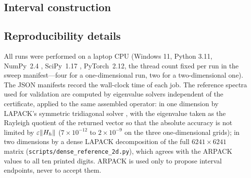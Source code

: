 \subsection{Interval construction}
\label{app:algorithm}

\begin{center}
\end{center}

\subsection{Reproducibility details}
\label{app:repro}

All runs were performed on a laptop CPU (Windows 11, Python 3.11,
NumPy~2.4 \citep{harris2020}, SciPy~1.17 \citep{virtanen2020}, PyTorch~2.12,
the thread count fixed per run in the sweep manifest---four for a
one-dimensional run, two for a two-dimensional one). The JSON manifests record
the wall-clock time of each job. The reference spectra used for validation are
computed by eigenvalue solvers independent of the certificate, applied to the
same assembled operator: in one dimension
by LAPACK's symmetric tridiagonal solver \citep{virtanen2020}, with the
eigenvalue taken as the Rayleigh quotient of the returned vector so that the
absolute accuracy is not limited by $\varepsilon\lVert H_h\rVert$ ($7\times10^{-12}$
to $2\times10^{-9}$ on the three one-dimensional grids); in
two dimensions by a dense LAPACK decomposition of the full
$6241\times6241$ matrix (\texttt{scripts/dense\_reference\_2d.py}), which
agrees with the ARPACK values to all ten printed digits. ARPACK is used only
to propose interval endpoints, never to accept them.

